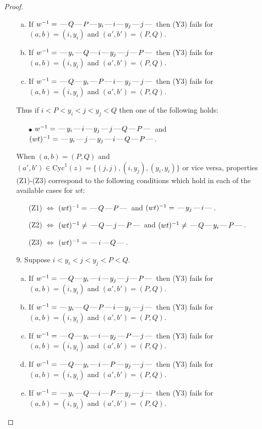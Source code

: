 \documentclass[10pt]{article}
\theoremstyle{definition}
\theoremstyle{definition}
\def\dash{\text{\hspace{0.5mm}---\hspace{0.5mm}}}
\def\Cyc{\mathrm{Cyc}}
\begin{document}
\begin{proof}
\begin{enumerate}
\begin{enumerate}[(a)]
\item If $w^{-1} = \dash Q\dash P\dash y_i\dash i\dash y_j\dash j\dash $ then (Y3) fails for $(a,b)=(i,y_i)$ and $(a',b')=(P,Q)$.
\item If $w^{-1} = \dash y_i\dash Q\dash i\dash y_j\dash j\dash P\dash $ then (Y3) fails for $(a,b)=(i,y_i)$ and $(a',b')=(P,Q)$.
\item If $w^{-1} = \dash Q\dash y_i\dash P\dash i\dash y_j\dash j\dash $ then (Y3) fails for $(a,b)=(i,y_i)$ and $(a',b')=(P,Q)$.
\end{enumerate}
Thus if $i < P < y_i < j < y_j < Q$ then one of the following holds:
\begin{enumerate}
\item[$\bullet$] $w^{-1} = \dash y_i\dash i\dash y_j\dash j\dash Q\dash P\dash $ and $(wt)^{-1} = \dash y_i\dash j\dash y_j\dash i\dash Q\dash P\dash $.
\end{enumerate}
When $(a,b)= (P,Q)$ and $(a',b')\in \Cyc^1(z)=\{(j,j),(i,y_j),(y_i,y_i)\}$ or vice versa,
properties (Z1)-(Z3) correspond to the following conditions which
hold in each of the available cases for $wt$:
\begin{enumerate}
\item[](Z1) $\Leftrightarrow$ $(wt)^{-1} = \dash Q \dash P \dash$  and $(wt)^{-1} = \dash y_j \dash i \dash$.
\item[](Z2) $\Leftrightarrow$ $(wt)^{-1} \neq \dash Q \dash j \dash P \dash$  and $(wt)^{-1} \neq \dash Q \dash y_i \dash P \dash$.
\item[](Z3) $\Leftrightarrow$ $(wt)^{-1} = \dash i \dash Q \dash$.
\end{enumerate}
\item[$9$.] Suppose $i < y_i < j < y_j < P < Q$.
\begin{enumerate}[(a)]
\item If $w^{-1} = \dash Q\dash y_i\dash i\dash y_j\dash j\dash P\dash $ then (Y3) fails for $(a,b)=(i,y_i)$ and $(a',b')=(P,Q)$.
\item If $w^{-1} = \dash y_i\dash Q\dash P\dash i\dash y_j\dash j\dash $ then (Y3) fails for $(a,b)=(i,y_i)$ and $(a',b')=(P,Q)$.
\item If $w^{-1} = \dash Q\dash y_i\dash i\dash y_j\dash P\dash j\dash $ then (Y3) fails for $(a,b)=(i,y_i)$ and $(a',b')=(P,Q)$.
\item If $w^{-1} = \dash Q\dash y_i\dash i\dash P\dash y_j\dash j\dash $ then (Y3) fails for $(a,b)=(i,y_i)$ and $(a',b')=(P,Q)$.
\item If $w^{-1} = \dash y_i\dash Q\dash i\dash P\dash y_j\dash j\dash $ then (Y3) fails for $(a,b)=(i,y_i)$ and $(a',b')=(P,Q)$.

\end{enumerate}
\end{enumerate}
\end{proof}
\end{document}
